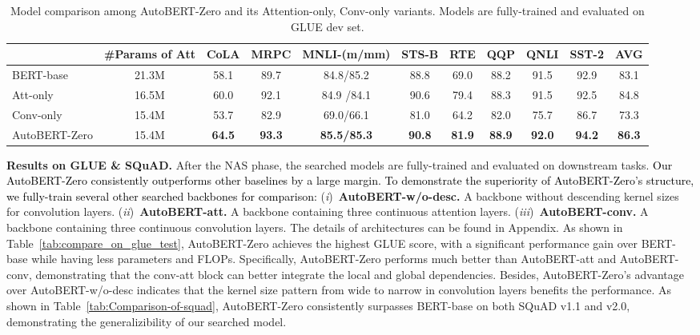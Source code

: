 \documentclass[letterpaper]{article} \usepackage{aaai22}  \usepackage{times}  \usepackage{helvet}  \usepackage{courier}  \usepackage[hyphens]{url}  \usepackage{graphicx} \urlstyle{rm} \def\UrlFont{\rm}  \usepackage{natbib}  \usepackage{caption} \DeclareCaptionStyle{ruled}{labelfont=normalfont,labelsep=colon,strut=off} \frenchspacing  \setlength{\pdfpagewidth}{8.5in}  \setlength{\pdfpageheight}{11in}  \usepackage{algorithm}
\newcommand{\Ni}{({\em i})~}
\newcommand{\Nii}{({\em ii})~}
\newcommand{\Niii}{({\em iii})~}
\newcommand{\prj}[1]{\textcolor{black}{#1}} \newcommand{\prjj}[1]{\textcolor{black}{#1}} \newcommand{\jhh}[1]{\textcolor{black}{#1}} \newcommand{\jh}[1]{\textcolor{black}{#1}} \newcommand{\sh}[1]{\textcolor{black}{#1}} \usepackage{multirow}
\begin{document}
\begin{table*}[t]
\begin{center}
\centering{}
\renewcommand\arraystretch{0.93}{
\begin{tabular}{lcccccccccc}
\hline
& \#Params of Att & CoLA & MRPC &  MNLI-(m/mm) &  STS-B & RTE &QQP &QNLI &SST-2 & AVG\tabularnewline
\hline
BERT-base &21.3M & 58.1  & 89.7   & 84.8/85.2  & 88.8 &69.0 &88.2 & 91.5 &92.9&83.1 \tabularnewline
Att-only & 16.5M & 60.0  &  92.1 &  84.9 /84.1 & 90.6  & 79.4 & 88.3 & 91.5 & 92.5 & 84.8 \tabularnewline
Conv-only  & 15.4M & 53.7  & 82.9  & 69.0/66.1  & 81.0  & 64.2 &82.0 & 75.7 &86.7 &73.3 \tabularnewline
AutoBERT-Zero & 15.4M & \textbf{64.5}  & \textbf{93.3}  & \textbf{85.5/85.3}  &\textbf{90.8}   &\textbf{81.9} & \textbf{88.9} & \textbf{92.0} & \textbf{94.2} & \textbf{86.3} \tabularnewline 
\hline
\end{tabular}}
\vspace{-2mm}
\caption{Model comparison among AutoBERT-Zero and its Attention-only, Conv-only variants. Models are fully-trained and evaluated on GLUE dev set. \label{tab:Comparison-of-different}}
\end{center}
\vspace{-4mm}
\end{table*}



\textbf{Results on GLUE \& SQuAD.} After the NAS phase, the searched models are fully-trained and evaluated on downstream tasks. \prj{Our AutoBERT-Zero consistently outperforms other baselines by a large margin. To demonstrate the superiority of AutoBERT-Zero's structure, we fully-train several other searched backbones for comparison:}
\Ni \textbf{AutoBERT-w/o-desc.} A backbone without descending kernel sizes for convolution layers.
\Nii \textbf{AutoBERT-att.} A backbone containing three continuous attention layers.
\Niii \textbf{AutoBERT-conv.} A backbone containing three continuous convolution layers. 
The details of architectures can be found in Appendix. As shown in Table~\ref{tab:compare_on_glue_test}, AutoBERT-Zero achieves the highest GLUE score, with a significant performance gain over BERT-base while having less parameters and FLOPs. Specifically, AutoBERT-Zero performs much better than AutoBERT-att and AutoBERT-conv, demonstrating that the conv-att block can better integrate the local and global dependencies. Besides, AutoBERT-Zero's advantage over AutoBERT-w/o-desc indicates that the kernel size pattern from wide to narrow in convolution layers benefits the performance. As shown in Table~\ref{tab:Comparison-of-squad}, AutoBERT-Zero consistently surpasses BERT-base on both SQuAD v1.1 and v2.0, demonstrating the generalizibility of our searched model. 
\end{document}
